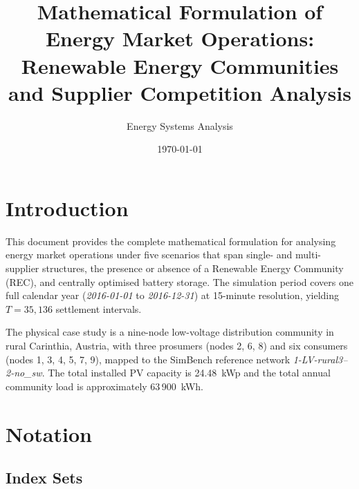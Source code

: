 \documentclass[12pt,a4paper]{article}
\title{\textbf{Mathematical Formulation of Energy Market Operations:\\
Renewable Energy Communities and Supplier Competition Analysis}}
\author{Energy Systems Analysis}
\date{\today}
\begin{document}
\maketitle
\tableofcontents
\newpage

\section{Introduction}

This document provides the complete mathematical formulation for analysing
energy market operations under five scenarios that span single- and
multi-supplier structures, the presence or absence of a Renewable Energy
Community (REC), and centrally optimised battery storage.  The simulation
period covers one full calendar year (\textit{2016-01-01} to
\textit{2016-12-31}) at 15-minute resolution, yielding $T = 35{,}136$
settlement intervals.

The physical case study is a nine-node low-voltage distribution community in
rural Carinthia, Austria, with three prosumers (nodes 2, 6, 8) and six
consumers (nodes 1, 3, 4, 5, 7, 9), mapped to the SimBench reference network
\textit{1-LV-rural3--2-no\_sw}.  The total installed PV capacity is
24.48~kWp and the total annual community load is approximately 63\,900~kWh.

\section{Notation}

\subsection{Index Sets}
\end{document}
